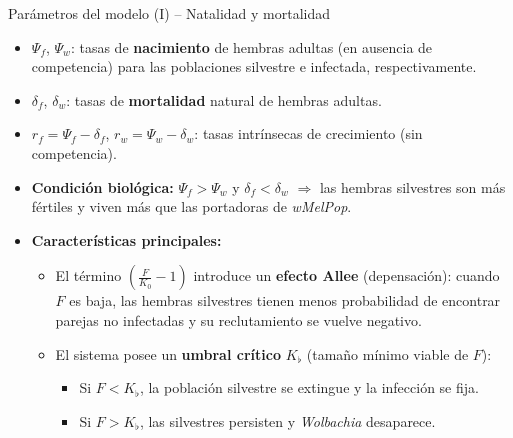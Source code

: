 \documentclass[10pt, aspectratio=169]{beamer}
\newcommand{\tb}{\textbf}
\newcommand{\ti}{\textit}
\begin{document}
\begin{frame}{Parámetros del modelo (I) – Natalidad y mortalidad}
\begin{itemize}
    \item $\Psi_f$, $\Psi_w$: tasas de \tb{nacimiento} de hembras adultas 
          (en ausencia de competencia) para las poblaciones silvestre e 
          infectada, respectivamente.
    \item $\delta_f$, $\delta_w$: tasas de \tb{mortalidad} natural de 
          hembras adultas.
    \item $r_f = \Psi_f - \delta_f$, \quad $r_w = \Psi_w - \delta_w$: 
          tasas intrínsecas de crecimiento (sin competencia).
    \item \textbf{Condición biológica:}  
          $\Psi_f > \Psi_w$ \quad y \quad $\delta_f < \delta_w$  
          $\Rightarrow$ las hembras silvestres son más fértiles y viven más 
          que las portadoras de \ti{wMelPop}.
    \item \textbf{Características principales:}
        \begin{itemize}
            \item El término $\left(\frac{F}{K_0}-1\right)$ introduce un 
              \textbf{efecto Allee} (depensación): cuando $F$ es baja, 
              las hembras silvestres tienen menos probabilidad de 
              encontrar parejas no infectadas y su reclutamiento se 
              vuelve negativo.
            \item El sistema posee un \textbf{umbral crítico} $K_{\flat}$ 
              (tamaño mínimo viable de $F$):
              \begin{itemize}
                  \item Si $F < K_{\flat}$, la población silvestre 
                        se extingue y la infección se fija.
                  \item Si $F > K_{\flat}$, las silvestres persisten 
                        y \textit{Wolbachia} desaparece.
        \end{itemize}
    \end{itemize}
    \end{itemize}
\end{frame}
\end{document}
